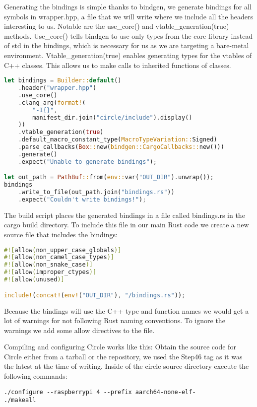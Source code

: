 Generating the bindings is simple thanks to bindgen, we generate bindings for all symbols in wrapper.hpp,
a file that we will write where we include all the headers interesting to us.
Notable are the use\_core() and vtable\_generation(true) methods.
Use\_core() tells bindgen to use only types from the core library instead of std in the bindings, which is necessary for us as we are targeting a bare-metal environment.
Vtable\_generation(true) enables generating types for the vtables of C++ classes.
This allows us to make calls to inherited functions of classes.
\begin{lstlisting}[language=Rust,style=colouredRust]
let bindings = Builder::default()
    .header("wrapper.hpp")
    .use_core()
    .clang_arg(format!(
        "-I{}",
        manifest_dir.join("circle/include").display()
    ))
    .vtable_generation(true)
    .default_macro_constant_type(MacroTypeVariation::Signed)
    .parse_callbacks(Box::new(bindgen::CargoCallbacks::new()))
    .generate()
    .expect("Unable to generate bindings");

let out_path = PathBuf::from(env::var("OUT_DIR").unwrap());
bindings
    .write_to_file(out_path.join("bindings.rs"))
    .expect("Couldn't write bindings!");
\end{lstlisting}

The build script places the generated bindings in a file called bindings.rs in the cargo build directory.
To include this file in our main Rust code we create a new source file that includes the bindings:
\begin{lstlisting}[language=Rust,style=colouredRust]
#![allow(non_upper_case_globals)]
#![allow(non_camel_case_types)]
#![allow(non_snake_case)]
#![allow(improper_ctypes)]
#![allow(unused)]

include!(concat!(env!("OUT_DIR"), "/bindings.rs"));
\end{lstlisting}
Because the bindings will use the C++ type and function names we would get a lot of warnings for not following Rust naming conventions.
To ignore the warnings we add some allow directives to the file.

Compiling and configuring Circle works like this:
Obtain the source code for Circle either from a tarball or the repository, we used the Step46 tag as it was the latest at the time of writing.
Inside of the circle source directory execute the following commands:
\begin{verbatim}
./configure --raspberrypi 4 --prefix aarch64-none-elf-
./makeall
\end{verbatim}

